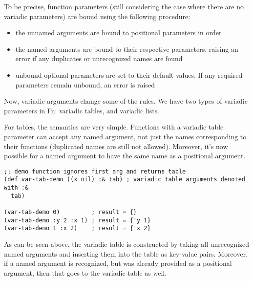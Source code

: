 \documentclass[11pt]{article}
\begin{document}
To be precise, function parameters (still considering the case where there are
no variadic parameters) are bound using the following procedure:
\begin{itemize}
\item the unnamed arguments are bound to positional parameters in order
\item the named arguments are bound to their respective parameters, raising an error
if any duplicates or unrecognized names are found
\item unbound optional parameters are set to their default values. If any required
parameters remain unbound, an error is raised
\end{itemize}

Now, variadic arguments change some of the rules. We have two types of variadic
parameters in Fn: variadic tables, and variadic lists.

For tables, the semantics are very simple. Functions with a variadic table
parameter can accept any named argument, not just the names corresponding to
their functions (duplicated names are still not allowed). Moreover, it's now
possible for a named argument to have the same name as a positional argument.
\begin{verbatim}
;; demo function ignores first arg and returns table
(def var-tab-demo ((x nil) :& tab) ; variadic table arguments denoted with :&
  tab)

(var-tab-demo 0)         ; result = {}
(var-tab-demo :y 2 :x 1) ; result = {'y 1}
(var-tab-demo 1 :x 2)    ; result = {'x 2}
\end{verbatim}

As can be seen above, the variadic table is constructed by taking all
unrecognized named arguments and inserting them into the table as key-value
pairs. Moreover, if a named argument is recognized, but was already provided as
a positional argument, then that goes to the variadic table as well.
\end{document}
